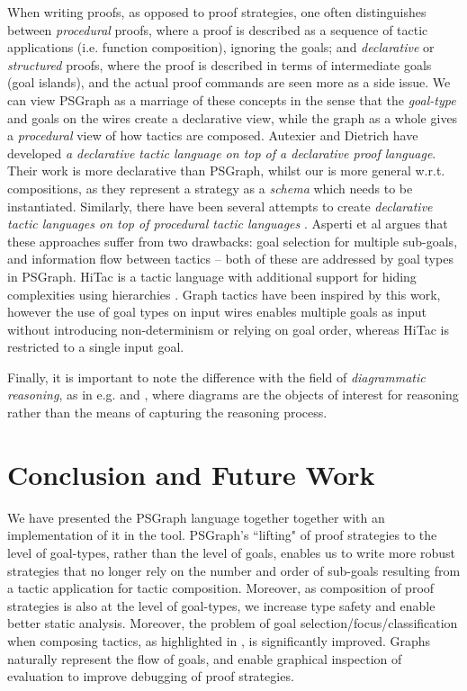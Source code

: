 \documentclass{llncs}
\begin{document}
When writing proofs, as opposed to proof strategies, one often 
distinguishes between \emph{procedural} proofs, where a proof is described as a sequence of tactic applications (i.e. function composition), ignoring the goals; and \emph{declarative} or \emph{structured} proofs, where the proof is described in terms of intermediate goals (goal islands), and the actual proof  commands are seen more as a side issue.  We can view PSGraph as a marriage of these concepts in the sense that the \emph{goal-type} and goals on the wires create a declarative view, while the graph as a whole gives a \emph{procedural} view of how tactics are composed.
Autexier and Dietrich \cite{Autexier10} have developed \emph{a declarative tactic language on top of a declarative proof language}. Their work is more declarative than PSGraph, whilst our is more general w.r.t. compositions, as they represent a strategy as a \emph{schema} which needs to be instantiated. 
Similarly, there have been several attempts to create \emph{declarative tactic languages on top of procedural tactic languages} \cite{Harrison96,Giero:07}. Asperti et al \cite{Asperti09} argues that these approaches suffer from two
drawbacks: goal selection for multiple sub-goals, and information flow between tactics -- both of these are addressed by goal types in PSGraph. HiTac is a tactic language with additional support for hiding complexities using hierarchies \cite{paper:Aspinall:2008,paper:Whiteside:11}. Graph tactics have been inspired by this work, however the use of goal types on input wires enables multiple
goals as input without introducing non-determinism or relying on goal order, whereas HiTac is restricted to a single input goal.

Finally, it is important to note the difference with the field of \emph{diagrammatic reasoning}, as in e.g. \cite{Jamnik01} and \cite{KissingerThesis}, where diagrams are the objects of interest for reasoning rather than the means of capturing the reasoning process.

\beforesection
\section{Conclusion and Future Work}\label{sec:conc}
\aftersection

We have presented the PSGraph language together together with an implementation of it in the \psgraphtool{} tool. PSGraph's ``lifting" of proof strategies to the level of goal-types, rather than the level of goals,  enables us to write more robust
strategies that no longer rely on the number and order of sub-goals resulting from a tactic application for tactic composition. Moreover, as composition of proof strategies is also at the level of goal-types, we increase type safety and enable better static analysis. Moreover, the problem of goal selection/focus/classification when composing tactics, as highlighted in \cite{Asperti09}, is significantly improved. Graphs naturally represent the flow of goals, and enable graphical inspection of evaluation to improve debugging of proof strategies.
\end{document}
